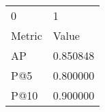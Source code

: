 \begin{tabular}{ll}
0 & 1 \\
Metric & Value \\
AP & 0.850848 \\
P@5 & 0.800000 \\
P@10 & 0.900000 \\
\end{tabular}
